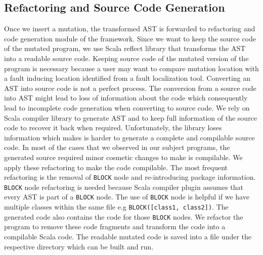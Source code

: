 \subsection{Refactoring and Source Code Generation}
Once we insert a mutation, the transformed AST is forwarded to refactoring and code generation module of the framework.  Since we want to keep the source code of the mutated program, we use Scala reflect library that transforms the AST into a readable source code. Keeping source code of the mutated version of the program is necessary because a user may want to compare mutation location with a fault inducing location identified from a fault localization tool. 
Converting an AST into source code is not a perfect process. The conversion from a source code into AST might lead to loss of information about the code which consequently lead to incomplete code generation when converting to source code. We rely on Scala compiler library to generate AST and to keep full information of the source code to recover it back when required. Unfortunately, the library loses information which makes is harder to generate a complete and compilable source code. In most of the cases that we observed in our subject programs, the generated source required minor cosmetic changes to make is compilable. We apply these refactoring to make the code compilable. The most frequent refactoring is the removal of  \texttt{BLOCK}  node and re-introducing package information.  \texttt{BLOCK}  node refactoring is needed because Scala compiler plugin assumes that every AST is part of a  \texttt{BLOCK}  node. The use of  \texttt{BLOCK}  node is helpful if we have multiple classes within the same file e.g  \texttt{BLOCK([class1, class2])}. The generated code  also contains the code for those  \texttt{BLOCK}  nodes. We refactor the program to remove these code fragments and transform the code into a compilable Scala code. The readable mutated code is saved into a file under the respective directory which can be built and run. 



